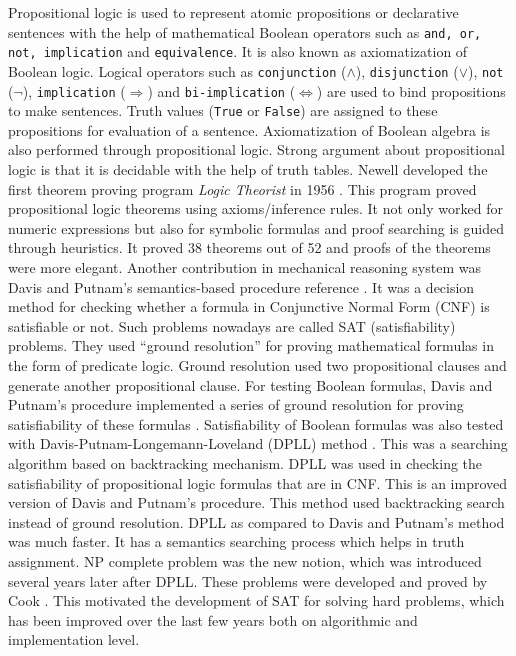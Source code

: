 Propositional logic is used to represent atomic propositions or declarative sentences with the help of mathematical Boolean operators such 
as \texttt{and, or, not, implication} and \texttt{equivalence}. It is also known as axiomatization of Boolean logic. Logical operators such as
 \texttt{conjunction} ($\wedge$), \texttt{disjunction} ($\vee$), \texttt{not} ($\neg$), \texttt{implication} ($\Longrightarrow$) and
\texttt{bi-implication} ($\Longleftrightarrow$) are used to bind propositions to make sentences. Truth values (\texttt{True} or 
\texttt{False}) are assigned to these propositions for evaluation of a sentence.  Axiomatization of Boolean algebra is also performed through
propositional logic. Strong argument about propositional logic is that it is decidable with the help of truth tables.
Newell developed the first theorem proving program {\em Logic Theorist} in 1956 . This program proved propositional logic theorems using
axioms/inference rules. It not only worked for numeric expressions but also for symbolic formulas and proof searching is guided through 
heuristics. It proved 38 theorems out of 52 and proofs of the theorems were more elegant. Another contribution in mechanical reasoning 
system was Davis and Putnam's semantics-based procedure reference . It was a decision method for checking whether a 
formula in Conjunctive Normal Form (CNF) is satisfiable or not. Such problems nowadays are called SAT (satisfiability) problems. They used ``ground
resolution'' for proving mathematical formulas in the form of predicate logic. Ground resolution used two propositional clauses and generate
another propositional clause. For testing Boolean formulas, Davis and Putnam's procedure implemented a series of ground resolution for 
proving satisfiability of these formulas . Satisfiability of Boolean formulas was also tested with Davis-Putnam-Longemann-Loveland 
(DPLL) method . This was a searching algorithm based on backtracking mechanism. DPLL was used in checking the 
satisfiability of propositional logic formulas that are in CNF. This is an improved version of Davis and Putnam's procedure. This method used 
backtracking search instead of ground resolution. DPLL as compared to Davis and Putnam's method was much faster. It has a semantics searching 
process which helps in truth assignment. NP complete problem  was the new notion, which was introduced several years later after 
DPLL. These problems were developed and proved by Cook . This motivated the development of SAT for solving hard problems, which has 
been improved over the last few years both on algorithmic and implementation level.

